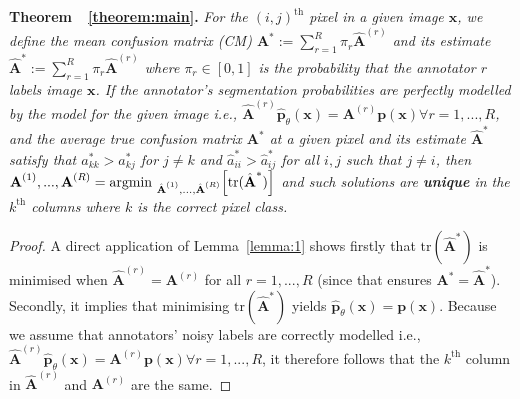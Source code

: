 \textbf{Theorem~~\ref{theorem:main}.}  \textit{For the $(i, j)^{\text{th}}$ pixel in a given image $\mathbf{x}$, we define the mean confusion matrix (CM) $\textbf{A}^*:= \sum_{r=1}^R \pi_r\hat{\textbf{A}}^{(r)}$ and its estimate $\hat{\textbf{A}}^{*}:=\sum_{r=1}^R \pi_r \hat{\textbf{A}}^{(r)}$ where $\pi_r\in [0,1]$ is the probability that the annotator $r$ labels image $\mathbf{x}$. If the annotator's segmentation probabilities are perfectly modelled by the model for the given image i.e., $\hat{\textbf{A}}^{(r)}\hat{\textbf{p}}_\theta(\textbf{x})=\textbf{A}^{(r)}\textbf{p}(\textbf{x}) \forall r=1,...,R$, and the average true confusion matrix $\textbf{A}^{*}$ at a given pixel and its estimate $\hat{\textbf{A}}^{*}$ satisfy that $a^*_{kk} > a^*_{kj}$ for $j \neq k$ and $\hat{a}^*_{ii} > \hat{a}^*_{ij}$ for all $i, j$ such that $j \neq i$, then  $\textbf{A}^{(1)}, ..., \textbf{A}^{(R)} = \text{argmin }_{\hat{\textbf{A}}^{(1)}, ..., \hat{\textbf{A}}^{(R)}}\Big{[}\text{tr}(\hat{\textbf{A}}^{*})\Big{]}$ and such solutions are \textbf{unique} in the $k^{\text{th}}$ columns where $k$ is the correct pixel class.  }

\begin{proof}
A direct application of Lemma~\ref{lemma:1} shows firstly that $\text{tr}(\hat{\textbf{A}}^{*})$ is minimised when $ \hat{\textbf{A}}^{(r)} = \textbf{A}^{(r)}$ for all $r=1,...,R$ (since that ensures $\textbf{A}^{*} = \hat{\textbf{A}}^{*}$). Secondly, it implies that minimising $\text{tr}(\hat{\textbf{A}}^{*})$ yields $ \hat{\textbf{p}}_\theta(\textbf{x}) = \textbf{p}(\textbf{x})$. Because we assume that annotators' noisy labels are correctly modelled i.e., $\hat{\textbf{A}}^{(r)}\hat{\textbf{p}}_\theta(\textbf{x})=\textbf{A}^{(r)}\textbf{p}(\textbf{x}) \forall r=1,...,R$, it therefore follows that the $k^{\text{th}}$ column in $\hat{\textbf{A}}^{(r)}$ and $\textbf{A}^{(r)}$ are the same. 
\end{proof}